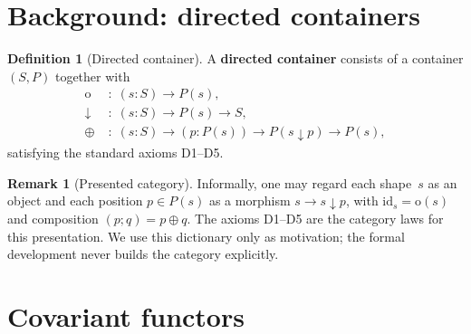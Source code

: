 \documentclass[11pt,a4paper]{article}
\theoremstyle{plain}
\theoremstyle{definition}
\newtheorem{definition}[theorem]{Definition}
\newtheorem{remark}[theorem]{Remark}
\newcommand{\id}{\mathrm{id}}
\newcommand{\rootp}{\mathrm{o}}
\begin{document}
\section{Background: directed containers}

\begin{definition}[Directed container]
A \textbf{directed container} consists of a container $(S,P)$ together with
\begin{align*}
  \rootp &\;:\; (s : S) \to P(s), \\
  \downarrow &\;:\; (s : S) \to P(s) \to S, \\
  \oplus &\;:\; (s : S) \to (p : P(s)) \to P(s \downarrow p) \to P(s),
\end{align*}
satisfying the standard axioms D1--D5.
\end{definition}

\begin{remark}[Presented category]
Informally, one may regard each shape~$s$ as an object and each position
$p \in P(s)$ as a morphism $s \to s \downarrow p$, with
$\id_s = \rootp(s)$ and composition $(p;q) = p \oplus q$. The axioms D1--D5
are the category laws for this presentation. We use this dictionary only as
motivation; the formal development never builds the category explicitly.
\end{remark}

\section{Covariant functors}
\end{document}
